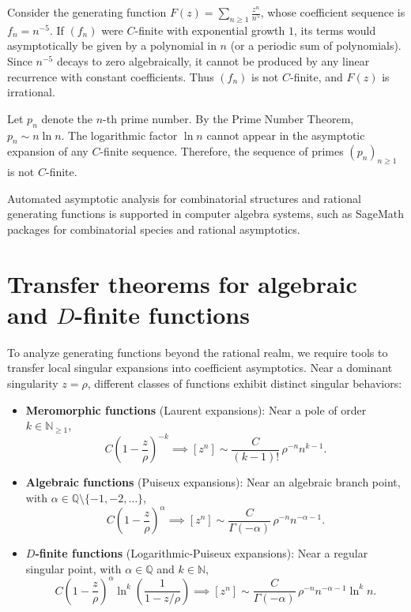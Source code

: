 \begin{example}
    Consider the generating function \(F(z) = \sum_{n \ge 1} \frac{z^n}{n^5}\), whose coefficient sequence is \(f_n = n^{-5}\).
    If \((f_n)\) were \(C\)-finite with exponential growth \(1\), its terms would asymptotically be given by a polynomial in \(n\) (or a periodic sum of polynomials).
    Since \(n^{-5}\) decays to zero algebraically, it cannot be produced by any linear recurrence with constant coefficients.
    Thus \((f_n)\) is not \(C\)-finite, and \(F(z)\) is irrational.
\end{example}

\begin{example}
    Let \(p_n\) denote the \(n\)-th prime number.
    By the Prime Number Theorem, \(p_n \sim n \ln n\).
    The logarithmic factor \(\ln n\) cannot appear in the asymptotic expansion of any \(C\)-finite sequence.
    Therefore, the sequence of primes \((p_n)_{n \ge 1}\) is not \(C\)-finite.
\end{example}

\begin{remark}
    Automated asymptotic analysis for combinatorial structures and rational generating functions is supported in computer algebra systems, such as SageMath packages for combinatorial species and rational asymptotics.
\end{remark}


\section*{Transfer theorems for algebraic and \texorpdfstring{\(D\)}{D}-finite functions}

To analyze generating functions beyond the rational realm, we require tools to transfer local singular expansions into coefficient asymptotics.
Near a dominant singularity \(z = \rho\), different classes of functions exhibit distinct singular behaviors:

\begin{itemize}
    \item \textbf{Meromorphic functions} (Laurent expansions):
    Near a pole of order \(k \in \mathbb{N}_{\ge 1}\),
    \[
        C \left( 1 - \frac{z}{\rho} \right)^{-k} \implies [z^n] \sim \frac{C}{(k-1)!} \, \rho^{-n} n^{k-1}.
    \]
    \item \textbf{Algebraic functions} (Puiseux expansions):
    Near an algebraic branch point, with \(\alpha \in \mathbb{Q} \setminus \{-1, -2, \dots\}\),
    \[
        C \left( 1 - \frac{z}{\rho} \right)^\alpha \implies [z^n] \sim \frac{C}{\Gamma(-\alpha)} \, \rho^{-n} n^{-\alpha - 1}.
    \]
    \item \textbf{\(D\)-finite functions} (Logarithmic-Puiseux expansions):
    Near a regular singular point, with \(\alpha \in \mathbb{Q}\) and \(k \in \mathbb{N}\),
    \[
        C \left( 1 - \frac{z}{\rho} \right)^\alpha \ln^k \left( \frac{1}{1 - z/\rho} \right) \implies [z^n] \sim \frac{C}{\Gamma(-\alpha)} \, \rho^{-n} n^{-\alpha - 1} \ln^k n.
    \]
\end{itemize}